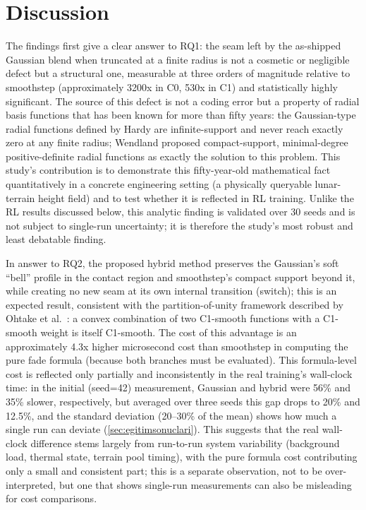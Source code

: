\section{Discussion}
\label{sec:tartisma}

The findings first give a clear answer to RQ1: the seam left by the
as-shipped Gaussian blend when truncated at a finite radius is not a
cosmetic or negligible defect but a structural one, measurable at three
orders of magnitude relative to smoothstep (approximately 3200x in C0,
530x in C1) and statistically highly significant. The source of this
defect is not a coding error but a property of radial basis functions
that has been known for more than fifty years: the Gaussian-type radial
functions defined by Hardy \citep{hardy1971multiquadric} are
infinite-support and never reach exactly zero at any finite radius;
Wendland \citep{wendland1995piecewise} proposed compact-support,
minimal-degree positive-definite radial functions as exactly the
solution to this problem. This study's contribution is to demonstrate
this fifty-year-old mathematical fact quantitatively in a concrete
engineering setting (a physically queryable lunar-terrain height field)
and to test whether it is reflected in RL training. Unlike the RL
results discussed below, this analytic finding is validated over 30
seeds and is not subject to single-run uncertainty; it is therefore the
study's most robust and least debatable finding.

In answer to RQ2, the proposed hybrid method preserves the Gaussian's
soft ``bell'' profile in the contact region and smoothstep's compact
support beyond it, while creating no new seam at its own internal
transition (switch); this is an expected result, consistent with the
partition-of-unity framework described by Ohtake et al.\
\citep{ohtake2003multiscale}: a convex combination of two C1-smooth
functions with a C1-smooth weight is itself C1-smooth. The cost of this
advantage is an approximately 4.3x higher microsecond cost than
smoothstep in computing the pure fade formula (because both branches
must be evaluated). This formula-level cost is reflected only partially
and inconsistently in the real training's wall-clock time: in the
initial (seed=42) measurement, Gaussian and hybrid were 56\% and 35\%
slower, respectively, but averaged over three seeds this gap drops to
20\% and 12.5\%, and the standard deviation (20--30\% of the mean) shows
how much a single run can deviate (\cref{sec:egitimsonuclari}). This
suggests that the real wall-clock difference stems largely from
run-to-run system variability (background load, thermal state, terrain
pool timing), with the pure formula cost contributing only a small and
consistent part; this is a separate observation, not to be
over-interpreted, but one that shows single-run measurements can also be
misleading for cost comparisons.

